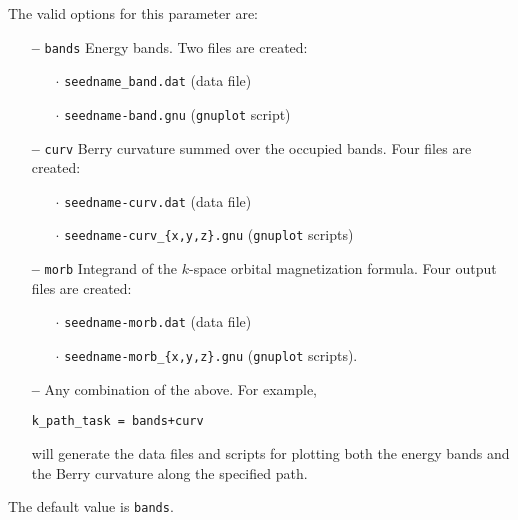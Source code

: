 The valid options for this parameter are:
\begin{itemize}

\item[{\bf --}] \verb#bands# Energy bands. Two files are
  created: 
\begin{itemize}
  
   \item[$\cdot$] {\tt seedname\_band.dat} (data file)

   \item[$\cdot$] {\tt seedname-band.gnu} ({\tt gnuplot} script)

\end{itemize}

\item[{\bf --}] \verb#curv# Berry curvature summed over the occupied
  bands. Four files are created:

\begin{itemize}

   \item[$\cdot$] {\tt seedname-curv.dat} (data file) 

   \item[$\cdot$] {\tt seedname-curv\_\{x,y,z\}.gnu} ({\tt gnuplot} scripts)

\end{itemize}

\item[{\bf --}] \verb#morb# Integrand of the $k$-space orbital
  magnetization formula. Four output files are created:

\begin{itemize}

   \item[$\cdot$] {\tt seedname-morb.dat} (data file)

   \item[$\cdot$] {\tt seedname-morb\_\{x,y,z\}.gnu} ({\tt gnuplot}
     scripts).

\end{itemize}

\item[{\bf --}] Any combination of the above. For example,

{\tt k\_path\_task = bands+curv}

will generate the data files and scripts for plotting both the energy
bands and the Berry curvature along the specified path.


\end{itemize}

The default value is {\tt bands}.


